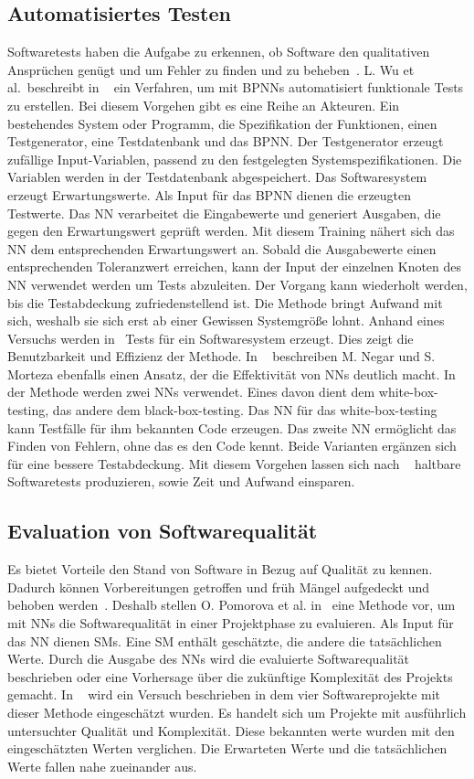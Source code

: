 \subsection{Automatisiertes Testen}
Softwaretests haben die Aufgabe zu erkennen, ob Software den qualitativen Ansprüchen genügt und um Fehler zu finden und zu beheben~\cite{Wu2008}.
L. Wu et al.~beschreibt in ~\cite{Wu2008} ein Verfahren, um mit BPNNs automatisiert funktionale Tests zu erstellen. 
Bei diesem Vorgehen gibt es eine Reihe an Akteuren. Ein bestehendes System oder Programm, die Spezifikation der Funktionen, einen Testgenerator, eine Testdatenbank und das BPNN. Der Testgenerator erzeugt zufällige Input-Variablen, passend zu den festgelegten Systemspezifikationen. Die Variablen werden in der Testdatenbank abgespeichert. Das Softwaresystem erzeugt Erwartungswerte. Als Input für das BPNN dienen die erzeugten Testwerte. Das NN verarbeitet die Eingabewerte und generiert Ausgaben, die gegen den Erwartungswert geprüft werden.
Mit diesem Trai\-ning nähert sich das NN dem entsprechenden Erwartungswert an.
Sobald die Ausgabewerte einen entsprechenden Toleranzwert erreichen, kann der Input der einzelnen Knoten des NN verwendet werden um Tests abzuleiten. Der Vorgang kann wiederholt werden, bis die Testabdeckung zufriedenstellend ist. Die Methode bringt Aufwand mit sich, weshalb sie sich erst ab einer Gewissen Systemgröße lohnt. Anhand eines Versuchs werden in~\cite{Wu2008} Tests für ein Softwaresystem erzeugt. Dies zeigt die Benutzbarkeit und Effizienz der Methode.
\noindent In ~\cite{Majma2014} beschreiben M. Negar und S. Morteza ebenfalls einen Ansatz, der die Effektivität von NNs deutlich macht. In der Methode werden zwei NNs verwendet. Eines davon dient dem white-box-testing, das andere dem black-box-testing. Das NN für das white-box-testing kann Testfälle für ihm bekannten Code erzeugen. Das zweite NN ermöglicht das Finden von Fehlern, ohne das es den Code kennt. Beide Varianten ergänzen sich für eine bessere Testabdeckung. Mit diesem Vorgehen lassen sich nach ~\cite{Majma2014} haltbare Softwaretests produzieren, sowie Zeit und Aufwand einsparen.

\subsection{Evaluation von Softwarequalität}
Es bietet Vorteile den Stand von Software in Bezug auf Qualität zu kennen. Dadurch können Vorbereitungen getroffen und früh Mängel aufgedeckt und behoben werden~\cite{Pomorova2013}. Deshalb stellen O. Pomorova et al. in~\cite{Pomorova2013} eine Methode vor, um mit NNs die Softwarequalität in einer Projektphase zu evaluieren. Als Input für das NN dienen SMs. Eine SM enthält geschätzte, die andere die tatsächlichen Werte.
Durch die Ausgabe des NNs wird die evaluierte Softwarequalität beschrieben oder eine Vorhersage über die zukünftige Komplexität des Projekts gemacht. 
In ~\cite{Pomorova2013} wird ein Versuch beschrieben in dem vier Softwareprojekte mit dieser Methode eingeschätzt wurden. Es handelt sich um Projekte mit ausführlich untersuchter Qualität und Komplexität. Diese bekannten werte wurden mit den eingeschätzten Werten verglichen. Die Erwarteten Werte und die tatsächlichen Werte fallen nahe zueinander aus.

